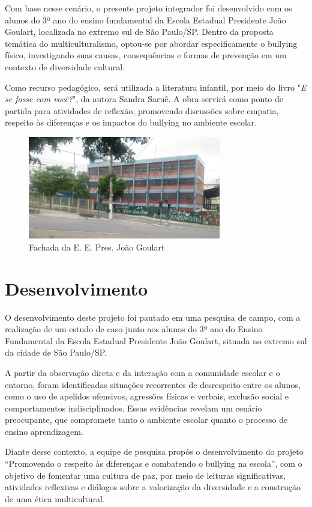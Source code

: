 	
	Com base nesse cenário, o presente projeto integrador foi desenvolvido com os alunos do 3º ano do ensino fundamental da Escola Estadual Presidente João Goulart, localizada no extremo sul de São Paulo/SP. Dentro da proposta temática do multiculturalismo, optou-se por abordar especificamente o bullying físico, investigando suas causas, consequências e formas de prevenção em um contexto de diversidade cultural. 
	
	Como recurso pedagógico, será utilizada a literatura infantil, por meio do livro "\textit{E se fosse com você?}", da autora Sandra Saruê. A obra servirá como ponto de partida para atividades de reflexão, promovendo discussões sobre empatia, respeito às diferenças e os impactos do bullying no ambiente escolar.

	\begin{figure}[h]
		\centering
		\includegraphics[width=0.75\textwidth]{./imgs_proj/fachada1.jpg}
		\caption{Fachada da E. E. Pres. João Goulart}
		\label{fig:fachada_escola}
	\end{figure}

\chapter{Desenvolvimento}
	O desenvolvimento deste projeto foi pautado em uma pesquisa de campo, com a realização de um estudo de caso junto aos alunos do 3º ano do Ensino Fundamental da Escola Estadual Presidente João Goulart, situada no extremo sul da cidade de São Paulo/SP. 
	
	A partir da observação direta e da interação com a comunidade escolar e o entorno, foram identificadas situações recorrentes de desrespeito entre os alunos, como o uso de apelidos ofensivos, agressões físicas e verbais, exclusão social e comportamentos indisciplinados. Essas evidências revelam um cenário preocupante, que compromete tanto o ambiente escolar quanto o processo de ensino aprendizagem. 
	
	Diante desse contexto, a equipe de pesquisa propôs o desenvolvimento do projeto “Promovendo o respeito às diferenças e combatendo o bullying na escola”, com o objetivo de fomentar uma cultura de paz, por meio de leituras significativas, atividades reflexivas e diálogos sobre a valorização da diversidade e a construção de uma ética multicultural. 
	
